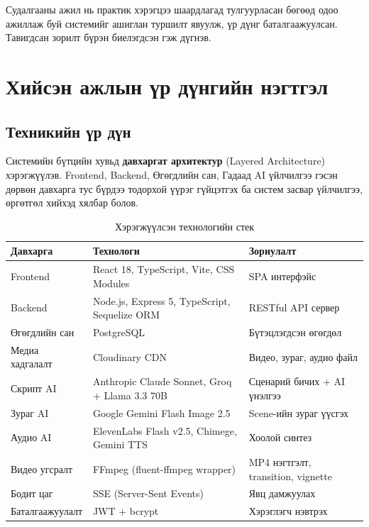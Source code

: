 Судалгааны ажил нь практик хэрэгцээ шаардлагад тулгуурласан бөгөөд одоо ажиллаж буй системийг ашиглан туршилт явуулж, үр дүнг баталгаажуулсан. Тавигдсан зорилт бүрэн биелэгдсэн гэж дүгнэв.

\section{Хийсэн ажлын үр дүнгийн нэгтгэл}

\subsection{Техникийн үр дүн}

Системийн бүтцийн хувьд \textbf{давхаргат архитектур} (Layered Architecture) хэрэгжүүлэв. Frontend, Backend, Өгөгдлийн сан, Гадаад AI үйлчилгээ гэсэн дөрвөн давхарга тус бүрдээ тодорхой үүрэг гүйцэтгэх ба систем засвар үйлчилгээ, өргөтгөл хийхэд хялбар болов.

\begin{table}[H]
\centering
\label{tab:tech_stack}
\begin{tabular}{|p{3.2cm}|p{4.5cm}|p{5cm}|}
\hline
\textbf{Давхарга} & \textbf{Технологи} & \textbf{Зориулалт} \\
\hline
Frontend & React 18, TypeScript, Vite, CSS Modules & SPA интерфэйс \\
\hline
Backend & Node.js, Express 5, TypeScript, Sequelize ORM & RESTful API сервер \\
\hline
Өгөгдлийн сан & PostgreSQL & Бүтэцлэгдсэн өгөгдөл \\
\hline
Медиа хадгалалт & Cloudinary CDN & Видео, зураг, аудио файл \\
\hline
Скрипт AI & Anthropic Claude Sonnet, Groq + Llama 3.3 70B & Сценарий бичих + AI үнэлгээ \\
\hline
Зураг AI & Google Gemini Flash Image 2.5 & Scene-ийн зураг үүсгэх \\
\hline
Аудио AI & ElevenLabs Flash v2.5, Chimege, Gemini TTS & Хоолой синтез \\
\hline
Видео угсралт & FFmpeg (fluent-ffmpeg wrapper) & MP4 нэгтгэлт, transition, vignette \\
\hline
Бодит цаг & SSE (Server-Sent Events) & Явц дамжуулах \\
\hline
Баталгаажуулалт & JWT + bcrypt & Хэрэглэгч нэвтрэх \\
\hline
\end{tabular}
\caption{Хэрэгжүүлсэн технологийн стек}
\end{table}

